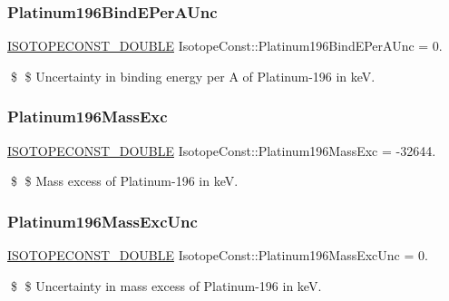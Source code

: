 \subsubsection{\texorpdfstring{Platinum196\+Bind\+E\+Per\+A\+Unc}{Platinum196BindEPerAUnc}}
{\footnotesize\ttfamily \mbox{\hyperlink{group___isotope_const-_macros_ga8f45a7272ce02c0b4c65c44636ed719a}{I\+S\+O\+T\+O\+P\+E\+C\+O\+N\+S\+T\+\_\+\+D\+O\+U\+B\+LE}} Isotope\+Const\+::\+Platinum196\+Bind\+E\+Per\+A\+Unc = 0.}

\$ \$ Uncertainty in binding energy per A of Platinum-\/196 in keV. \mbox{\label{group___isotope_const-_platinum-_pt196_gaffc7c8239768ac56fefce366a18d0efd}} 
\subsubsection{\texorpdfstring{Platinum196\+Mass\+Exc}{Platinum196MassExc}}
{\footnotesize\ttfamily \mbox{\hyperlink{group___isotope_const-_macros_ga8f45a7272ce02c0b4c65c44636ed719a}{I\+S\+O\+T\+O\+P\+E\+C\+O\+N\+S\+T\+\_\+\+D\+O\+U\+B\+LE}} Isotope\+Const\+::\+Platinum196\+Mass\+Exc = -\/32644.}

\$ \$ Mass excess of Platinum-\/196 in keV. \mbox{\label{group___isotope_const-_platinum-_pt196_ga5ce37639e0675df3d1dad19927041c9a}} 
\subsubsection{\texorpdfstring{Platinum196\+Mass\+Exc\+Unc}{Platinum196MassExcUnc}}
{\footnotesize\ttfamily \mbox{\hyperlink{group___isotope_const-_macros_ga8f45a7272ce02c0b4c65c44636ed719a}{I\+S\+O\+T\+O\+P\+E\+C\+O\+N\+S\+T\+\_\+\+D\+O\+U\+B\+LE}} Isotope\+Const\+::\+Platinum196\+Mass\+Exc\+Unc = 0.}

\$ \$ Uncertainty in mass excess of Platinum-\/196 in keV. \mbox{\label{group___isotope_const-_platinum-_pt196_ga3c445ed0436e404033f2b29770f1dc5c}} 
